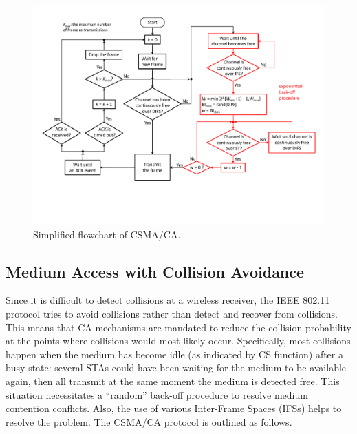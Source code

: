 \begin{figure}[!t]
	\centering
	\includegraphics[width=1.0\columnwidth]{figures2/CSMA-CA-flowchart}
	\caption{Simplified flowchart of CSMA/CA.}
	\label{figs:CSMA-CA-flowchart}
\end{figure}


\subsection{Medium Access with Collision Avoidance}
\label{collision-avoidance}

Since it is difficult to detect collisions at a wireless receiver, the IEEE 802.11 protocol tries to avoid collisions rather than detect and recover from collisions. This means that CA mechanisms are mandated to reduce the collision probability at the points where collisions would most likely occur. Specifically, most collisions happen when the medium has become idle (as indicated by CS function) after a busy state: several STAs could have been waiting for the medium to be available again, then all transmit at the same moment the medium is detected free. This situation necessitates a ``random'' back-off procedure to resolve medium contention conflicts. Also, the use of various Inter-Frame Spaces (IFSs) helps to resolve the problem. The CSMA/CA protocol is outlined as follows.

